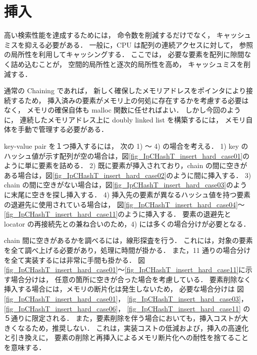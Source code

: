 \section{挿入}

高い検索性能を達成するためには，
命令数を削減するだけでなく，
キャッシュミスを抑える必要がある．
一般に，CPU は配列の連続アクセスに対して，
参照の局所性を利用してキャッシングする．
ここでは，
必要な要素を配列に隙間なく詰め込むことが，
空間的局所性と逐次的局所性を高め，
キャッシュミスを削減する．

通常の Chaining であれば，
新しく確保したメモリアドレスをポインタにより接続するため，
挿入済みの要素がメモリ上の何処に存在するかを考慮する必要はなく，
メモリの確保自体も malloc 関数に任せればよい．
しかし今回のように，
連続したメモリアドレス上に doubly linked list を構築するには，
メモリ自体を手動で管理する必要がある．

key-value pair を１つ挿入するには，
次の 1) 〜 4) の場合を考える．
1) key のハッシュ値が示す配列が空の場合は，図\ref{fig_IpCHashT_insert_hard_case01}のように単に要素を詰める．
2) 既に要素が挿入されており，chain の間に空きがある場合は，図\ref{fig_IpCHashT_insert_hard_case02}のように間に挿入する．
3) chain の間に空きがない場合は，図\ref{fig_IpCHashT_insert_hard_case03}のように末尾に空きを探し挿入する．
4) 挿入先の要素が異なるハッシュ値を持つ要素の退避先に使用されている場合は，
図\ref{fig_IpCHashT_insert_hard_case04}〜\ref{fig_IpCHashT_insert_hard_case11}のように挿入する．
要素の退避先と locator の再接続先との兼ね合いのため，4) には多くの場合分けが必要となる．

chain 間に空きがあるかを調べるには，線形探査を行う．
これには，対象の要素を全て調べ上げる必要があり，処理に時間が掛かる．
また，11 通りの場合分けを全て実装するには非常に手間も掛かる．
図\ref{fig_IpCHashT_insert_hard_case01}〜\ref{fig_IpCHashT_insert_hard_case11}に示す場合分けは，
任意の箇所に空きが合った場合を考慮している．
要素削除なく挿入する場合には，メモリの断片化は発生しないため，
必要な場合分けは
図\ref{fig_IpCHashT_insert_hard_case01}，
\ref{fig_IpCHashT_insert_hard_case03}，
\ref{fig_IpCHashT_insert_hard_case06}，
\ref{fig_IpCHashT_insert_hard_case11}
の５通りに限定される．
また，要素削除を伴う場合においても，挿入コストが大きくなるため，推奨しない．
これは，実装コストの低減および，挿入の高速化と引き換えに，
要素の削除と再挿入によるメモリ断片化への耐性を捨てることを意味する．

